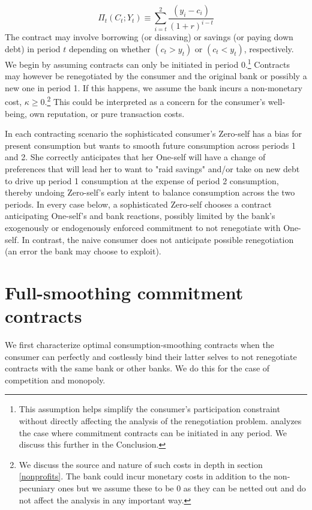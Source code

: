 \documentclass[11pt,english]{article}
\theoremstyle{plain}
\theoremstyle{definition}
\begin{document}
\begin{equation}
\Pi_{t}(C_{t};Y_{t})\equiv\sum\limits _{i=t}^{2}\frac{\left(y_{i}-c_{i}\right)}{\left(1+r\right)^{i-t}}\label{eq:profit}
\end{equation}
The contract may involve borrowing (or dissaving) or savings (or
paying down debt) in period $t$ depending on whether $(c_{t}>y_{t})$
or $(c_{t}<y_{t})$, respectively. We begin by assuming contracts
can only be initiated in period 0.\footnote{This assumption helps simplify the consumer's participation constraint without directly affecting the analysis of the renegotiation problem. \citet{basu2020} analyzes the case where commitment contracts can be initiated in any period. We discuss this further in the Conclusion.} Contracts may however be renegotiated by the consumer and the original
bank or possibly a new one in period 1. If this happens, we assume
the bank incurs a non-monetary cost, $\kappa\geq0$.\footnote{We discuss the source and nature of such costs in depth in section
\ref{nonprofits}. The bank could incur monetary costs in addition
to the non-pecuniary ones but we assume these to be 0 as they can
be netted out and do not affect the analysis in any important way.} This could be interpreted as a concern for the consumer's
well-being, own reputation, or pure transaction costs.

In each contracting scenario the sophisticated consumer's Zero-self
has a bias for present consumption but wants to smooth future consumption
across periods 1 and 2. She correctly anticipates that her One-self
will have a change of preferences that will lead her to want to "raid
savings" and/or take on new debt to drive up period 1 consumption
at the expense of period 2 consumption, thereby undoing Zero-self's
early intent to balance consumption across the two periods. In every
case below, a sophisticated Zero-self chooses a contract anticipating One-self's and
bank reactions, possibly limited by the bank's exogenously or endogenously
enforced commitment to not renegotiate with One-self. In contrast,
the naive consumer does not anticipate possible renegotiation (an
error the bank may choose to exploit).

\section{Full-smoothing commitment contracts }

We first characterize optimal consumption-smoothing contracts when
the consumer can perfectly and costlessly bind their latter selves
to not renegotiate contracts with the same bank or
other banks. We do this for the case of competition and monopoly.
\end{document}
